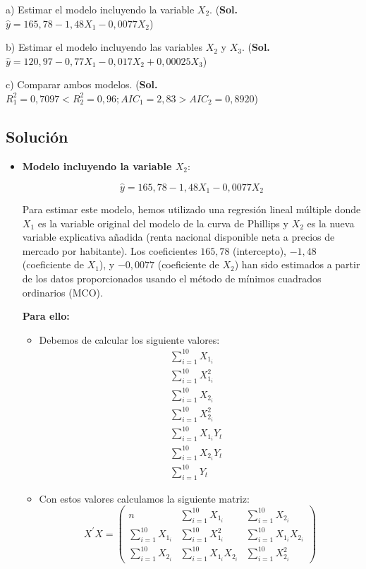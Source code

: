 \documentclass[a4paper,12pt]{article}
\begin{document}
a) Estimar el modelo incluyendo la variable \(X_2\). (\textbf{Sol.} \(\hat{y} = 165,78 - 1,48X_1 - 0,0077X_2\))

b) Estimar el modelo incluyendo las variables \(X_2\) y \(X_3\). (\textbf{Sol.} \(\hat{y} = 120,97 - 0,77X_1 - 0,017X_2 + 0,00025X_3\))

c) Comparar ambos modelos. (\textbf{Sol.} \(R^2_1 = 0,7097 < R^2_2 = 0,96; AIC_1 = 2,83 > AIC_2 = 0,8920\))

\subsection*{Solución}
\begin{itemize}
  \item \textbf{Modelo incluyendo la variable \(X_2\)}:
  

\[
  \hat{y} = 165,78 - 1,48X_1 - 0,0077X_2
  \]



  Para estimar este modelo, hemos utilizado una regresión lineal múltiple donde \(X_1\) es la variable original del modelo de la curva de Phillips y \(X_2\) es la nueva variable explicativa añadida (renta nacional disponible neta a precios de mercado por habitante). Los coeficientes \(165,78\) (intercepto), \(-1,48\) (coeficiente de \(X_1\)), y \(-0,0077\) (coeficiente de \(X_2\)) han sido estimados a partir de los datos proporcionados usando el método de mínimos cuadrados ordinarios (MCO).

  \textbf{Para ello:}

  \begin{itemize}
    \item Debemos de calcular los siguiente valores:
    \begin{align*}
        \sum_{i=1}^{10} X_{1_i} & \\
        \sum_{i=1}^{10} X_{1_i}^2 & \\
        \sum_{i=1}^{10} X_{2_i} & \\
        \sum_{i=1}^{10} X_{2_i}^2 & \\
        \sum_{i=1}^{10} X_{1_i}Y_{t} & \\
        \sum_{i=1}^{10} X_{2_i}Y_{t} & \\
        \sum_{i=1}^{10} Y_{t} &
    \end{align*}
    \item Con estos valores calculamos la siguiente matriz:
    \begin{equation*}
        X^{\prime}X = \begin{pmatrix}
            n & \sum_{i=1}^{10} X_{1_i} & \sum_{i=1}^{10} X_{2_i} \\
            \sum_{i=1}^{10} X_{1_i} & \sum_{i=1}^{10} X_{1_i}^2 & \sum_{i=1}^{10} X_{1_i}X_{2_i} \\
            \sum_{i=1}^{10} X_{2_i} & \sum_{i=1}^{10} X_{1_i}X_{2_i} & \sum_{i=1}^{10} X_{2_i}^2
        \end{pmatrix}
    \end{equation*}


\end{itemize}
\end{itemize}
\end{document}
